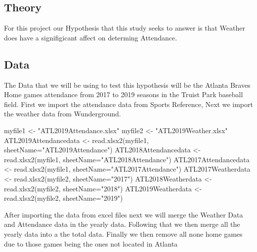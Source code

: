 \documentclass[
]{article}
\newenvironment{Shaded}{\begin{snugshade}}{\end{snugshade}}
\newcommand{\AttributeTok}[1]{\textcolor[rgb]{0.77,0.63,0.00}{#1}}
\newcommand{\FunctionTok}[1]{\textcolor[rgb]{0.00,0.00,0.00}{#1}}
\newcommand{\NormalTok}[1]{#1}
\newcommand{\OtherTok}[1]{\textcolor[rgb]{0.56,0.35,0.01}{#1}}
\newcommand{\StringTok}[1]{\textcolor[rgb]{0.31,0.60,0.02}{#1}}
\begin{document}
\hypertarget{theory}{%
\subsection{Theory}\label{theory}}

For this project our Hypothesis that this study seeks to answer is that
Weather does have a signifigicant affect on determing Attendance.

\hypertarget{data}{%
\subsection{Data}\label{data}}

The Data that we will be using to test this hypothesis will be the
Atlanta Braves Home games attendance from 2017 to 2019 seasons in the
Truist Park baseball field. First we import the attendance data from
Sports Reference, Next we import the weather data from Wunderground.

\begin{Shaded}
\begin{Highlighting}[]
\NormalTok{myfile1 }\OtherTok{\textless{}{-}} \StringTok{"ATL2019Attendance.xlsx"}
\NormalTok{myfile2 }\OtherTok{\textless{}{-}} \StringTok{"ATL2019Weather.xlsx"}
\NormalTok{ATL2019Attendancedata }\OtherTok{\textless{}{-}} \FunctionTok{read.xlsx2}\NormalTok{(myfile1, }\AttributeTok{sheetName=}\StringTok{"ATL2019Attendance"}\NormalTok{)}
\NormalTok{ATL2018Attendancedata }\OtherTok{\textless{}{-}} \FunctionTok{read.xlsx2}\NormalTok{(myfile1, }\AttributeTok{sheetName=}\StringTok{"ATL2018Attendance"}\NormalTok{)}
\NormalTok{ATL2017Attendancedata }\OtherTok{\textless{}{-}} \FunctionTok{read.xlsx2}\NormalTok{(myfile1, }\AttributeTok{sheetName=}\StringTok{"ATL2017Attendance"}\NormalTok{)}
\NormalTok{ATL2017Weatherdata }\OtherTok{\textless{}{-}} \FunctionTok{read.xlsx2}\NormalTok{(myfile2, }\AttributeTok{sheetName=}\StringTok{"2017"}\NormalTok{)}
\NormalTok{ATL2018Weatherdata }\OtherTok{\textless{}{-}} \FunctionTok{read.xlsx2}\NormalTok{(myfile2, }\AttributeTok{sheetName=}\StringTok{"2018"}\NormalTok{)}
\NormalTok{ATL2019Weatherdata }\OtherTok{\textless{}{-}} \FunctionTok{read.xlsx2}\NormalTok{(myfile2, }\AttributeTok{sheetName=}\StringTok{"2019"}\NormalTok{)}
\end{Highlighting}
\end{Shaded}

After importing the data from excel files next we will merge the Weather
Data and Attendance data in the yearly data. Following that we then
merge all the yearly data into a the total data. Finally we then remove
all none home games due to those games being the ones not located in
Atlanta
\end{document}
